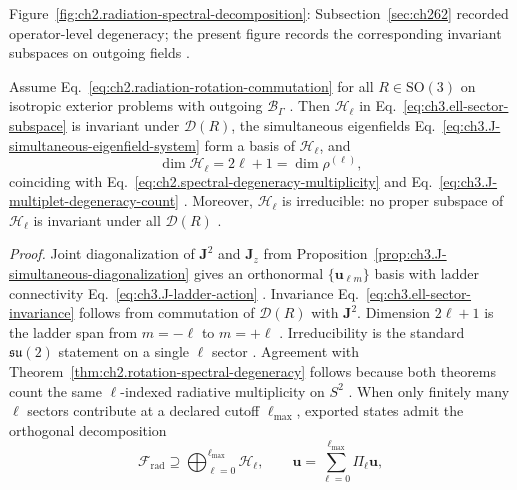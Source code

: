 Figure~\ref{fig:ch2.radiation-spectral-decomposition}: Subsection~\ref{sec:ch262} recorded operator-level
degeneracy; the present figure records the corresponding invariant subspaces on outgoing fields
\cite{stratton1941}.
\begin{theorem}
\label{thm:ch3.J-irrep-degeneracy}
Assume Eq.~\eqref{eq:ch2.radiation-rotation-commutation} for all \(R\in\mathrm{SO}(3)\) on isotropic
exterior problems with outgoing \(\mathcal{B}_\Gamma\) \cite{stratton1941}. Then
\(\mathcal{H}_{\ell}\) in Eq.~\eqref{eq:ch3.ell-sector-subspace} is invariant under
\(\mathcal{D}(R)\), the simultaneous eigenfields
Eq.~\eqref{eq:ch3.J-simultaneous-eigenfield-system} form a basis of \(\mathcal{H}_{\ell}\), and
\begin{equation}
\label{eq:ch3.J-irrep-dimension-identity}
\dim\mathcal{H}_{\ell}
=
2\ell+1
=
\dim\rho^{(\ell)},
\end{equation}
coinciding with Eq.~\eqref{eq:ch2.spectral-degeneracy-multiplicity} and
Eq.~\eqref{eq:ch3.J-multiplet-degeneracy-count} \cite{jackson1999}.
Moreover, \(\mathcal{H}_{\ell}\) is irreducible: no proper subspace of \(\mathcal{H}_{\ell}\) is
invariant under all \(\mathcal{D}(R)\) \cite{jackson1999}.
\end{theorem}
\noindent\textit{Proof.}
Joint diagonalization of \(\mathbf{J}^{2}\) and \(\mathbf{J}_{z}\) from
Proposition~\ref{prop:ch3.J-simultaneous-diagonalization} gives an orthonormal
\(\{\mathbf{u}_{\ell m}\}\) basis with ladder connectivity
Eq.~\eqref{eq:ch3.J-ladder-action} \cite{jackson1999}. Invariance
Eq.~\eqref{eq:ch3.ell-sector-invariance} follows from commutation of \(\mathcal{D}(R)\) with
\(\mathbf{J}^{2}\). Dimension \(2\ell+1\) is the ladder span from \(m=-\ell\) to \(m=+\ell\)
\cite{jackson1999}. Irreducibility is the standard \(\mathfrak{su}(2)\) statement on a single
\(\ell\) sector \cite{jackson1999}. Agreement with
Theorem~\ref{thm:ch2.rotation-spectral-degeneracy} follows because both theorems count the same
\(\ell\)-indexed radiative multiplicity on \(S^{2}\) \cite{stratton1941}.
When only finitely many \(\ell\) sectors contribute at a declared cutoff \(\ell_{\max}\), exported states
admit the orthogonal decomposition
\begin{equation}
\label{eq:ch3.Frad-ell-direct-sum}
\mathcal{F}_{\mathrm{rad}}
\supseteq
\bigoplus_{\ell=0}^{\ell_{\max}}
\mathcal{H}_{\ell},
\qquad
\mathbf{u}
=
\sum_{\ell=0}^{\ell_{\max}}
\Pi_{\ell}\mathbf{u},
\end{equation}
